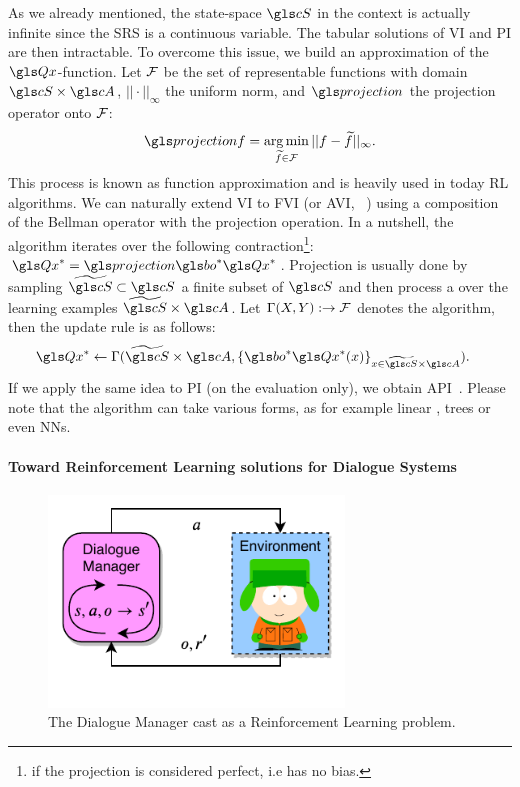 As we already mentioned, the state-space $\cS$ in the  context is actually infinite since the \gls{SRS} is a continuous variable. The tabular solutions of \gls{VI} and \gls{PI} are then intractable. To overcome this issue, we build an approximation of the $\Q$-function. Let $\mathcal{F}$ be the set of representable functions with domain $\cS\times\cA$, $|| \cdot ||_{\infty}$ the uniform norm, and $\projection$ the projection operator onto $\mathcal{F}$:
\begin{align}
    \projection f = \argmin_{\tilde{f}\in \cF} || f - \tilde{f} ||_{\infty}.
\end{align}
This process is known as function approximation and is heavily used in today \gls{RL} algorithms. We can naturally extend \gls{VI} to \gls{FVI} (or \gls{AVI}, ~\textcite{bellman59}) using a composition of the  Bellman operator with the projection operation. In a nutshell, the algorithm iterates over the following contraction\footnote{if the projection is considered perfect, i.e has no bias.}: $\Q^* = \projection\bo^{*} \Q^*$. Projection is usually done by sampling $\tilde{\cS}\subset \cS$ a finite subset of $\cS$ and then process a  over the learning examples $ \tilde{\cS}\times \cA$. Let $\Gamma (X,Y): \rightarrow \mathcal{F}$ denotes the  algorithm, then the update rule is as follows:
\begin{align}
    &\Q^* \leftarrow \Gamma(\tilde{\cS}\times \cA,\{\bo^{*} \Q^*(x)\}_{x\in \tilde{\cS}\times \cA}).
\end{align}
If we apply the same idea to \gls{PI} (on the evaluation only), we obtain \gls{API}~\parencite{bertsekas1996}. Please note that the  algorithm can take various forms, as for example linear ,  trees or even \acrlong{NN}s.

\paragraph{Toward Reinforcement Learning solutions for Dialogue Systems}

\begin{figure}
    \begin{center}
        \includegraphics[width=0.7\textwidth]{sources/dm-rl/rl-pipeline}
        \caption{\label{fig:rl-pipeline} The Dialogue Manager cast as a Reinforcement Learning problem.}
    \end{center}
\end{figure}

